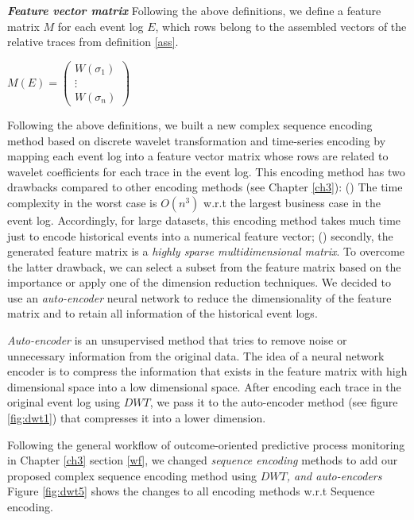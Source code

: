 \begin{definition}{\textit{\textbf{Feature vector matrix}}}
 	Following the above definitions, we define a feature matrix $M$ for each event log $E$, which rows belong to the assembled vectors of the relative traces from definition \ref{ass}. 	
 	\begin{center}
 		$M(E) = \begin{pmatrix}
 		W(\sigma_1) \\
 		\vdots\\
 		W(\sigma_n)
 		\end{pmatrix} $
 	\end{center}
\end{definition}
 
Following the above definitions, we built a new complex sequence encoding method based on discrete wavelet transformation and time-series encoding by mapping each event log into a feature vector matrix whose rows are related to wavelet coefficients for each trace in the event log. This encoding method has two drawbacks compared to other encoding methods (see Chapter \ref{ch3}): () The time complexity in the worst case is $O(n^3)$ w.r.t the largest business case in the event log. Accordingly, for large datasets, this encoding method takes much time just to encode historical events into a numerical feature vector; () secondly, the generated feature matrix is a \textit{highly sparse multidimensional matrix}. To overcome the latter drawback, we can select a subset from the feature matrix based on the importance or apply one of the dimension reduction techniques.  We decided to use an \textit{auto-encoder} neural network to reduce the dimensionality of the feature matrix and to retain all information of the historical event logs. 

\textit{Auto-encoder} is an unsupervised method that tries to remove noise or unnecessary information from the original data. The idea of a neural network encoder is to compress the information that exists in the feature matrix with high dimensional space into a low dimensional space.  After encoding each trace in the original event log using $DWT$, we pass it to the auto-encoder method (see figure \ref{fig:dwt1}) that compresses it into a lower dimension. 


Following the general workflow of outcome-oriented predictive process monitoring in Chapter \ref{ch3} section \ref{wf}, we changed \textit{sequence encoding} methods to add our proposed complex sequence encoding method using \textit{$DWT$, and auto-encoders} Figure \ref{fig:dwt5} shows the changes to all encoding methods w.r.t Sequence encoding.

